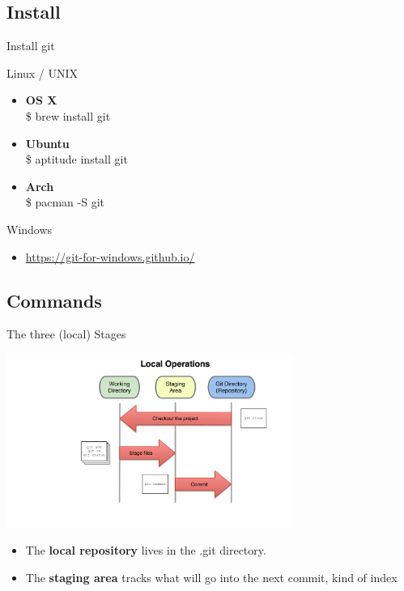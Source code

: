 \documentclass[10pt,xcolor=dvipsnames]{beamer}
\begin{document}
\subsection{Install}

\begin{frame}{Install git}
\begin{block}{Linux / UNIX}
     \begin{itemize}
       \setlength\itemsep{0.2in}
       \item {\bf OS X}\\ \$ brew install git %
       \item {\bf Ubuntu}\\ \$ aptitude install git
       \item {\bf Arch}\\ \$ pacman -S git
     \end{itemize}
\end{block}

\begin{block}{Windows}
    \begin{itemize}
      \item \url{https://git-for-windows.github.io/}
    \end{itemize}
\end{block}
\end{frame}

\subsection{Commands}

\begin{frame}{The three (local) Stages}
\begin{center}
\includegraphics[width = 0.7\textwidth]{three_states.pdf}
\end{center}
\begin{itemize}
\item The {\bf local repository} lives in the .git directory.
\item The {\bf staging area} tracks what will go into the next commit, kind of index
\end{itemize}
\end{frame}
\end{document}
